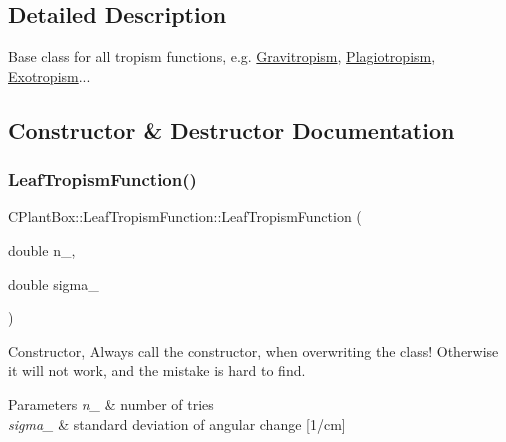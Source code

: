 \subsection{Detailed Description}
Base class for all tropism functions, e.\+g. \hyperlink{classCPlantBox_1_1Gravitropism}{Gravitropism}, \hyperlink{classCPlantBox_1_1Plagiotropism}{Plagiotropism}, \hyperlink{classCPlantBox_1_1Exotropism}{Exotropism}... 

\subsection{Constructor \& Destructor Documentation}
\mbox{\label{classCPlantBox_1_1LeafTropismFunction_ad6f1d7478d104e20cd210fb69dee0d74}} 
\subsubsection{\texorpdfstring{Leaf\+Tropism\+Function()}{LeafTropismFunction()}\hspace{0.1cm}{\footnotesize\ttfamily [1/2]}}
{\footnotesize\ttfamily C\+Plant\+Box\+::\+Leaf\+Tropism\+Function\+::\+Leaf\+Tropism\+Function (\begin{DoxyParamCaption}\item[{double}]{n\+\_\+,  }\item[{double}]{sigma\+\_\+ }\end{DoxyParamCaption})\hspace{0.3cm}{\ttfamily [inline]}}

Constructor, Always call the constructor, when overwriting the class! Otherwise it will not work, and the mistake is hard to find.


\begin{DoxyParams}{Parameters}
{\em n\+\_\+} & number of tries \\
\hline
{\em sigma\+\_\+} & standard deviation of angular change \mbox{[}1/cm\mbox{]} \\
\hline
\end{DoxyParams}
\mbox{\label{classCPlantBox_1_1LeafTropismFunction_ab5227b152c52aff90ce8d267c71c401a}} 

